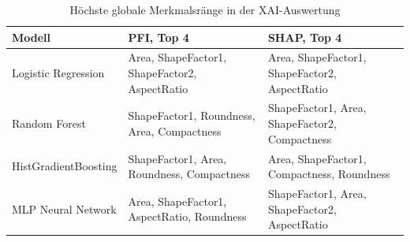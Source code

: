 \begin{table}
\caption{Höchste globale Merkmalsränge in der XAI-Auswertung}
\label{tab:xai_modellvergleich}
\begin{tabular}{lll}
\toprule
Modell & PFI, Top 4 & SHAP, Top 4 \\
\midrule
Logistic Regression & Area, ShapeFactor1, ShapeFactor2, AspectRatio & Area, ShapeFactor1, ShapeFactor2, AspectRatio \\
Random Forest & ShapeFactor1, Roundness, Area, Compactness & ShapeFactor1, Area, ShapeFactor2, Compactness \\
HistGradientBoosting & ShapeFactor1, Area, Roundness, Compactness & Area, ShapeFactor1, Compactness, Roundness \\
MLP Neural Network & Area, ShapeFactor1, AspectRatio, Roundness & ShapeFactor1, Area, ShapeFactor2, AspectRatio \\
\bottomrule
\end{tabular}
\end{table}
